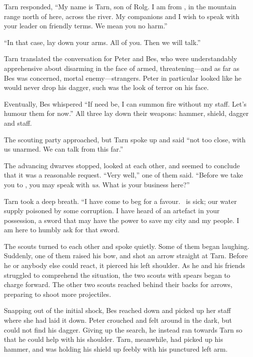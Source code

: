 Tarn responded, ``My name is Tarn, son of Rolg.  I am from \korbarthrond, in the mountain range north of here, across the river.  My companions and I wish to speak with your leader on friendly terms.  We mean you no harm.''

``In that case, lay down your arms.  All of you.  Then we will talk.''

Tarn translated the conversation for Peter and Bes, who were understandably apprehensive about disarming in the face of armed, threatening---and as far as Bes was concerned, mortal enemy---strangers.  Peter in particular looked like he would never drop his dagger, such was the look of terror on his face.

Eventually, Bes whispered ``If need be, I can summon fire without my staff.  Let's humour them for now.''  All three lay down their weapons: hammer, shield, dagger and staff.

The scouting party approached, but Tarn spoke up and said ``not too close, with us unarmed.  We can talk from this far.''

The advancing dwarves stopped, looked at each other, and seemed to conclude that it was a reasonable request.  ``Very well,'' one of them said.  ``Before we take you to \tholkunrond, you may speak with \emph{us}.  What is your business here?''

Tarn took a deep breath.  ``I have come to beg for a favour.  \korbarthrond\ is sick; our water supply poisoned by some corruption.  I have heard of an artefact in your possession, a sword that may have the power to save my city and my people.  I am here to humbly ask for that sword.

The scouts turned to each other and spoke quietly.  Some of them began laughing.  Suddenly, one of them raised his bow, and shot an arrow straight at Tarn.  Before he or anybody else could react, it pierced his left shoulder.  As he and his friends struggled to comprehend the situation, the two scouts with spears began to charge forward.  The other two scouts reached behind their backs for arrows, preparing to shoot more projectiles.

Snapping out of the initial shock, Bes reached down and picked up her staff where she had laid it down.  Peter crouched and felt around in the dark, but could not find his dagger.  Giving up the search, he instead ran towards Tarn so that he could help with his shoulder.  Tarn, meanwhile, had picked up his hammer, and was holding his shield up feebly with his punctured left arm.

